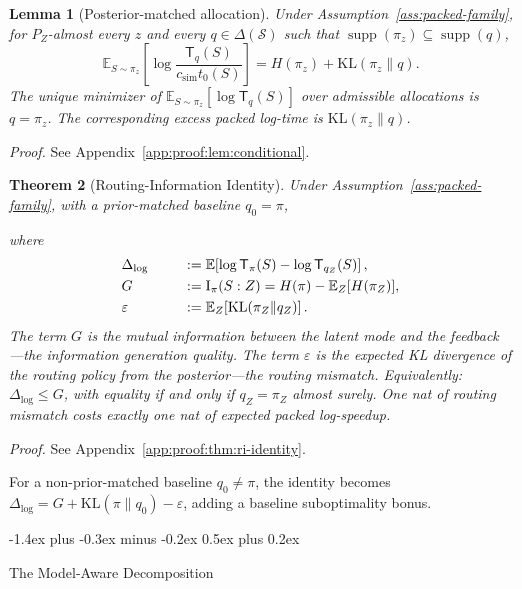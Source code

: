 \documentclass[10pt,twocolumn]{article}
\makeatletter
\theoremstyle{paperplain}
\newtheorem{theorem}{Theorem}[section]
\newtheorem{lemma}[theorem]{Lemma}
\theoremstyle{paperdefinition}
\theoremstyle{paperremark}
\renewcommand{\subsection}{%
  \@startsection{subsection}{2}{\z@}%
    {-1.4ex plus -0.3ex minus -0.2ex}%
    {0.5ex plus 0.2ex}%
    {\normalfont\normalsize\bfseries\raggedright}}
\newcommand{\KL}{\mathrm{KL}}
\newcommand{\I}{\mathrm{I}}
\newcommand{\E}{\mathbb{E}}
\newcommand{\cS}{\mathcal{S}}
\newcommand{\Dlog}{\Delta_{\log}}
\newcommand{\boxeddisplay}[1]{%
  \begin{center}
  \setlength{\fboxsep}{5pt}%
  \fbox{\(\displaystyle #1\)}
  \end{center}
}
\makeatother
\begin{document}
\begin{lemma}[Posterior-matched allocation]
\label{lem:conditional}
Under Assumption~\ref{ass:packed-family}, for $P_Z$-almost every $z$ and every
$q\in\Delta(\cS)$ such that
$\operatorname{supp}(\pi_z)\subseteq\operatorname{supp}(q)$,
\[
\E_{S\sim\pi_z}\!\left[
\log\frac{\mathsf T_q(S)}{c_{\mathrm{sim}}t_0(S)}
\right]
=H(\pi_z)+\KL(\pi_z\|q).
\]
The unique minimizer of $\E_{S\sim\pi_z}[\log\mathsf T_q(S)]$ over admissible
allocations is $q=\pi_z$.  The corresponding excess packed log-time is
$\KL(\pi_z\|q)$.
\end{lemma}

\par\noindent\emph{Proof.} See Appendix~\ref{app:proof:lem:conditional}.\par


\begin{theorem}[Routing-Information Identity]
\label{thm:ri-identity}
Under Assumption~\ref{ass:packed-family}, with a prior-matched baseline $q_0 = \pi$,
\boxeddisplay{\Dlog = G - \varepsilon}
where
\begin{align}
\makebox[4.4em][l]{$\Dlog$}
&:= \E\!\left[\log \mathsf{T}_\pi(S)-\log \mathsf{T}_{q_Z}(S)\right], \nonumber\\
\makebox[4.4em][l]{$G$}
&:= \I_\pi(S : Z)=H(\pi)-\E_Z[H(\pi_Z)], \label{eq:G-def} \\
\makebox[4.4em][l]{$\varepsilon$}
&:= \E_Z\!\left[\KL(\pi_Z \| q_Z)\right]. \label{eq:eps-def}
\end{align}
The term $G$ is the mutual information between the latent mode and the feedback---the \emph{information generation quality}.
The term $\varepsilon$ is the expected KL divergence of the routing policy from the posterior---the \emph{routing mismatch}.
Equivalently: $\Dlog \le G$, with equality if and only if $q_Z = \pi_Z$ almost surely.
One nat of routing mismatch costs exactly one nat of expected packed
log-speedup.
\end{theorem}

\par\noindent\emph{Proof.} See Appendix~\ref{app:proof:thm:ri-identity}.\par


For a non-prior-matched baseline $q_0 \ne \pi$, the identity becomes $\Dlog = G + \KL(\pi \| q_0) - \varepsilon$, adding a baseline suboptimality bonus.

\subsection{The Model-Aware Decomposition}
\label{subsec:four-term}
\end{document}
